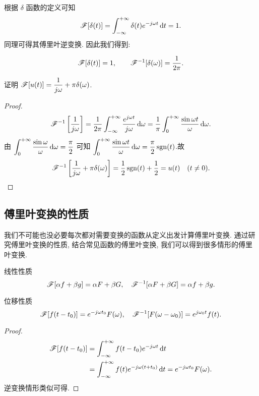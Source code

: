 根据 $\delta$ 函数的定义可知
\[\mathscr{F}[\delta(t)]=\int_{-\infty}^{+\infty}\delta(t)e^{-j\omega t}\,\mathrm{d} t=1.\]
同理可得其傅里叶逆变换.
因此我们得到:
\begin{alertblock@}
	\[\mathscr{F}[\delta(t)]=1,\qquad
	\mathscr{F}^{-1}[\delta(\omega)]=\dfrac1{2\pi}.\]
\end{alertblock@}

\begin{example}
	证明 \emph{$\mathscr{F}[u(t)]=\dfrac1{j\omega}+\pi\delta(\omega)$}.
\end{example}

\begin{proof}
		\[\mathscr{F}^{-1}\left[\frac1{j\omega}\right]
		=\frac1{2\pi}\int_{-\infty}^{+\infty}\frac{e^{j\omega t}}{j\omega} \,\mathrm{d}\omega
		=\frac1\pi\int_0^{+\infty}\frac{\sin\omega t}{\omega} \,\mathrm{d}\omega.\]
	{由
		$\displaystyle\int_0^{+\infty}\frac{\sin\omega}\omega \,\mathrm{d}\omega=\dfrac\pi2$
		可知
		$\displaystyle\int_0^{+\infty}\frac{\sin\omega t}\omega \,\mathrm{d}\omega=\frac\pi2\operatorname{sgn}(t)$.故
		\[\mathscr{F}^{-1} \left[\frac1{j\omega}+\pi\delta(\omega)\right]
		=\frac{1}{2}\operatorname{sgn}(t)+\frac{1}{2} =u(t)\quad (t\neq 0).\qedhere\]
	}
\end{proof}

\subsection{傅里叶变换的性质}

我们不可能也没必要每次都对需要变换的函数从定义出发计算傅里叶变换.
通过研究傅里叶变换的性质, 结合常见函数的傅里叶变换, 我们可以得到很多情形的傅里叶变换.

\begin{block}{线性性质}
	\[\mathscr{F}[\alpha f+\beta g]=\alpha F+\beta G,\quad
	\mathscr{F}^{-1}[\alpha F+\beta G]=\alpha f+\beta g.\]
\end{block}

\begin{block}{位移性质}
	\[\mathscr{F}[f(t-t_0)]=e^{-j\omega t_0}F(\omega),\quad
	\mathscr{F}^{-1}[F(\omega-\omega_0)]=e^{j\omega_0 t}f(t).\]
\end{block}

\begin{proof}
	\begin{align*}
		\mathscr{F}[f(t-t_0)]&=\int_{-\infty}^{+\infty}f(t-t_0)e^{-j\omega t}\,\mathrm{d} t\\
		&=\int_{-\infty}^{+\infty}f(t)e^{-j\omega (t+t_0)}\,\mathrm{d} t=e^{-j\omega t_0}F(\omega).
	\end{align*}
	{逆变换情形类似可得.\qedhere}
\end{proof}

